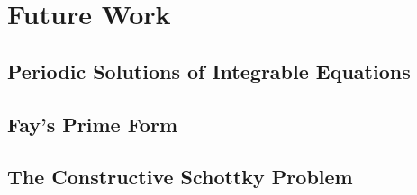 \documentclass{article}
\begin{document}
\section{Future Work}

\subsection{Periodic Solutions of Integrable Equations}

\subsection{Fay's Prime Form}

\subsection{The Constructive Schottky Problem}


\end{document}
